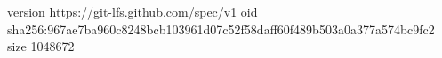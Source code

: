 version https://git-lfs.github.com/spec/v1
oid sha256:967ae7ba960c8248bcb103961d07c52f58daff60f489b503a0a377a574bc9fc2
size 1048672
